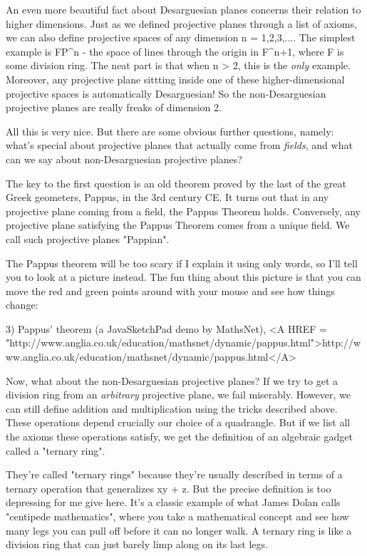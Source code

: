 An even more beautiful fact about Desarguesian planes concerns their
relation to higher dimensions.  Just as we defined projective planes
through a list of axioms, we can also define projective  spaces of any
dimension n = 1,2,3,....  The simplest example is FP^{n} - the space of
lines through the origin in F^{n+1}, where F is some division
ring.  The neat part is that when n > 2,
this is the \emph{only} example.  Moreover, any projective plane sittting
inside one of these higher-dimensional projective spaces is automatically 
Desarguesian!  So the non-Desarguesian projective planes are really
freaks of dimension 2.  

All this is very nice.   But there are some obvious further questions, 
namely: what's special about projective planes that actually come from
\emph{fields}, and what can we say about non-Desarguesian projective planes?

The key to the first question is an old theorem proved by the last of
the great Greek geometers, Pappus, in the 3rd century CE.  It turns out
that in any projective plane coming from a field, the Pappus Theorem
holds.  Conversely, any projective plane satisfying the Pappus Theorem 
comes from a unique field.  We call such projective planes "Pappian".

The Pappus theorem will be too scary if I explain it using only words,
so I'll tell you to look at a picture instead.  The fun thing about this 
picture is that you can move the red and green points around with your 
mouse and see how things change:

3) Pappus' theorem (a JavaSketchPad demo by MathsNet),
<A HREF = "http://www.anglia.co.uk/education/mathsnet/dynamic/pappus.html">http://www.anglia.co.uk/education/mathsnet/dynamic/pappus.html</A>

Now, what about the non-Desarguesian projective planes?  If we try to
get a division ring from an \emph{arbitrary} projective plane, we fail
miserably.  However, we can still define addition and multiplication
using the tricks described above.  These operations depend crucially our
choice of a quadrangle.  But if we list all the axioms these operations
satisfy, we get the definition of an algebraic gadget called a "ternary
ring".   

They're called "ternary rings" because they're usually described in
terms of a ternary operation that generalizes xy + z.   But the precise
definition is too depressing for me give here.  It's a classic example
of what James Dolan calls "centipede mathematics", where you take a
mathematical concept and see how many legs you can pull off before it
can no longer walk.   A ternary ring is like a division ring that can
just barely limp along on its last legs. 

